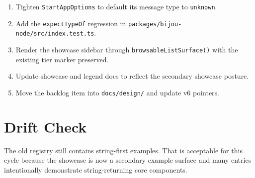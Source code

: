 \begin{enumerate}
\def\labelenumi{\arabic{enumi}.}
\tightlist
\item
  Tighten \texttt{S\allowbreak{}t\allowbreak{}a\allowbreak{}r\allowbreak{}t\allowbreak{}A\allowbreak{}p\allowbreak{}p\allowbreak{}O\allowbreak{}p\allowbreak{}t\allowbreak{}i\allowbreak{}o\allowbreak{}n\allowbreak{}s} to default its message type to \texttt{u\allowbreak{}n\allowbreak{}k\allowbreak{}n\allowbreak{}o\allowbreak{}w\allowbreak{}n}.
\item
  Add the \texttt{e\allowbreak{}x\allowbreak{}p\allowbreak{}e\allowbreak{}c\allowbreak{}t\allowbreak{}T\allowbreak{}y\allowbreak{}p\allowbreak{}e\allowbreak{}O\allowbreak{}f} regression in \texttt{p\allowbreak{}a\allowbreak{}c\allowbreak{}k\allowbreak{}a\allowbreak{}g\allowbreak{}e\allowbreak{}s\allowbreak{}/\allowbreak{}b\allowbreak{}i\allowbreak{}j\allowbreak{}o\allowbreak{}u\allowbreak{}-\allowbreak{}n\allowbreak{}o\allowbreak{}d\allowbreak{}e\allowbreak{}/\allowbreak{}s\allowbreak{}r\allowbreak{}c\allowbreak{}/\allowbreak{}i\allowbreak{}n\allowbreak{}d\allowbreak{}e\allowbreak{}x\allowbreak{}.\allowbreak{}t\allowbreak{}e\allowbreak{}s\allowbreak{}t\allowbreak{}.\allowbreak{}t\allowbreak{}s}.
\item
  Render the showcase sidebar through \texttt{b\allowbreak{}r\allowbreak{}o\allowbreak{}w\allowbreak{}s\allowbreak{}a\allowbreak{}b\allowbreak{}l\allowbreak{}e\allowbreak{}L\allowbreak{}i\allowbreak{}s\allowbreak{}t\allowbreak{}S\allowbreak{}u\allowbreak{}r\allowbreak{}f\allowbreak{}a\allowbreak{}c\allowbreak{}e\allowbreak{}(\allowbreak{})} with the existing tier marker preserved.
\item
  Update showcase and legend docs to reflect the secondary showcase posture.
\item
  Move the backlog item into \texttt{d\allowbreak{}o\allowbreak{}c\allowbreak{}s\allowbreak{}/\allowbreak{}d\allowbreak{}e\allowbreak{}s\allowbreak{}i\allowbreak{}g\allowbreak{}n\allowbreak{}/} and update v6 pointers.
\end{enumerate}

\section{Drift Check}\label{record-131-drift-check}

The old registry still contains string-first examples. That is acceptable for this cycle because the showcase is now a secondary example surface and many entries intentionally demonstrate string-returning core components.

